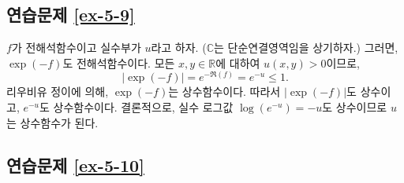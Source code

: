 \subsection*{연습문제 \ref{ex-5-9}}

$f$가 전해석함수이고 실수부가 $u$라고 하자.
($\mathbb C$는 단순연결영역임을 상기하자.)
그러면, $\exp(-f)$도 전해석함수이다.
모든 $x,y \in\mathbb R$에 대하여 $u(x,y) >0$이므로,
\[
|\exp(-f)| = e^{-\Re(f)} = e^{-u} \le 1.
\]
리우비유 정이에 의해, $\exp(-f)$는 상수함수이다.
따라서 $|\exp(-f)|$도 상수이고, $e^{-u}$도 상수함수이다.
결론적으로, 실수 로그값 $\log(e^{-u}) = -u$도 상수이므로
$u$는 상수함수가 된다.

\subsection*{연습문제 \ref{ex-5-10}}


